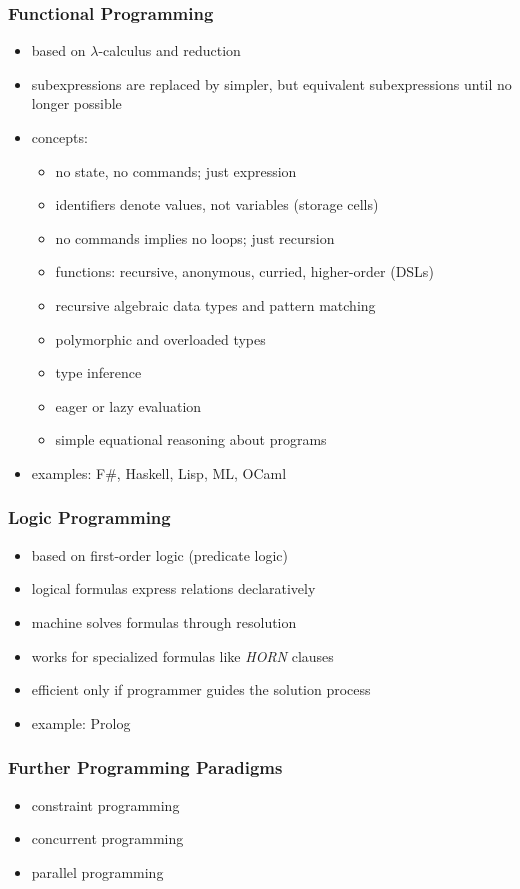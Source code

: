 \begin{multicols}{2}
\subsubsection{Functional Programming}
\begin{itemize}
  \item based on $\lambda$-calculus and reduction
  \item subexpressions are replaced by simpler, but equivalent subexpressions until no longer possible
  \item concepts:
  \begin{itemize}
    \item no state, no commands; just expression
    \item identifiers denote values, not variables (storage cells)
    \item no commands implies no loops; just recursion
    \item functions: recursive, anonymous, curried, higher-order (DSLs)
    \item recursive algebraic data types and pattern matching
    \item polymorphic and overloaded types
    \item type inference
    \item eager or lazy evaluation
    \item simple equational reasoning about programs
  \end{itemize}
  \item examples: F\#, Haskell, Lisp, ML, OCaml
\end{itemize}

\subsubsection{Logic Programming}
\begin{itemize}
  \item based on first-order logic (predicate logic)
  \item logical formulas express relations declaratively
  \item machine solves formulas through resolution
  \item works for specialized formulas like \textit{HORN} clauses
  \item efficient only if programmer guides the solution process
  \item example: Prolog
\end{itemize}

\subsubsection{Further Programming Paradigms}
\begin{itemize}
  \item constraint programming
  \item concurrent programming
  \item parallel programming
\end{itemize}


\end{multicols}
